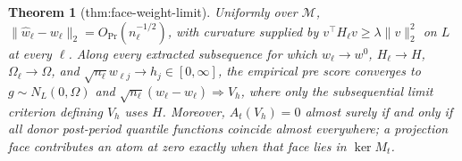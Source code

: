 \documentclass{article}
\newtheorem{theorem}{Theorem}
\begin{document}
\begin{theorem}[thm:face-weight-limit]\label{thm:face-weight-limit}
Uniformly over \(\mathcal M\), \(\|\widehat w_\ell-w_\ell\|_2=O_{\Pr}(n_\ell^{-1/2})\), with curvature supplied by \(v^\top H_\ell v\geq\lambda\|v\|_2^2\) on \(L\) at every \(\ell\).  Along every extracted subsequence for which \(w_\ell\to w^0\), \(H_\ell\to H\), \(\Omega_\ell\to\Omega\), and \(\sqrt{n_\ell}w_{\ell j}\to h_j\in[0,\infty]\), the empirical pre score converges to \(g\sim N_L(0,\Omega)\) and \(\sqrt{n_\ell}(\widehat w_\ell-w_\ell)\Rightarrow V_h\), where only the subsequential limit criterion defining \(V_h\) uses \(H\).  Moreover, \(A_t(V_h)=0\) almost surely if and only if all donor post-period quantile functions coincide almost everywhere; a projection face contributes an atom at zero exactly when that face lies in \(\ker M_t\).
\end{theorem}
\end{document}
